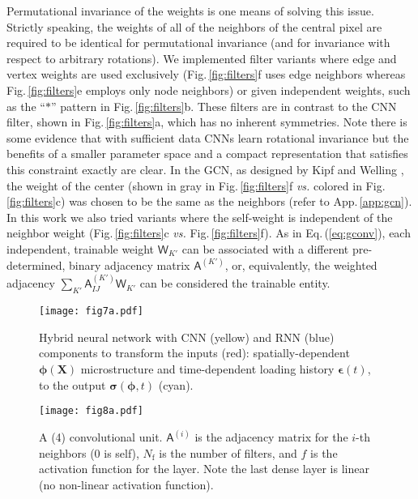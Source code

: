 \documentclass[12pt,reqno]{article}
\newcommand{\ADD}[1]{{#1}}
\newcommand{\aref}[1]{App.\,\ref{#1}}
\newcommand{\fref}[1]{Fig.\,\ref{#1}}
\newcommand{\eref}[1]{Eq.\,(\ref{#1})}
\newcommand{\vs}{{\it vs.}\! }
\newcommand{\Xb}{\mathbf{X}}
\newcommand{\As}{\mathsf{A}}
\newcommand{\Ws}{\mathsf{W}}
\newcommand{\epsilonb}{{\boldsymbol{\epsilon}}}
\newcommand{\sigmab}{{\boldsymbol{\sigma}}}
\newcommand{\phib}{{\boldsymbol{\phi}}}
\newcommand{\arch}[3]{({#1}\text{:}{#2}\text{:}{#3})}
\begin{document}
Permutational invariance of the weights is one means of solving this issue.
Strictly speaking, the  weights of all of the  neighbors of the central pixel are required to be identical for permutational invariance (and for invariance with respect to arbitrary rotations).
We implemented filter variants where edge and vertex weights are used exclusively \ADD{(\fref{fig:filters}f uses edge neighbors whereas \fref{fig:filters}e employs only node neighbors)} or given independent weights, such as the ``$\ast$'' pattern in \fref{fig:filters}b.
\ADD{
These filters are in contrast to the CNN filter, shown in \fref{fig:filters}a, which has no inherent symmetries.
}
Note there is some evidence that with sufficient data CNNs learn rotational invariance \cite{quiroga2018revisiting} but the benefits of a smaller parameter space and a compact representation that satisfies this constraint exactly are clear.
In the GCN, as designed by Kipf and Welling \cite{kipf2016semi}, the weight of the center (shown in gray in \fref{fig:filters}f \vs colored in \fref{fig:filters}c) was chosen to be the same as the neighbors (refer to \aref{app:gcn}).
In this work we also tried variants where the self-weight is independent of the neighbor weight (\fref{fig:filters}c \vs \fref{fig:filters}f).
\ADD{
As in \eref{eq:gconv}, each independent, trainable weight $\Ws_{K'}$ can be associated with a different pre-determined, binary adjacency matrix $\As^{(K')}$, or, equivalently, the weighted adjacency  $\sum_{K'} \As^{(K')}_{IJ} \Ws_{K'}$ can be considered the trainable entity.
}

\begin{figure}
\centering
\texttt{[image: fig7a.pdf]}
\caption{Hybrid neural network with CNN (yellow) and RNN (blue) components to transform the inputs (red): spatially-dependent $\phib(\Xb)$ microstructure and time-dependent loading history $\epsilonb(t)$, to the output $\sigmab(\phib,t)$ (cyan).
}
\label{fig:architecture}
\end{figure}

\begin{figure}
\centering
\texttt{[image: fig8a.pdf]}
\caption{\ADD{A \arch{4}{2}{2} convolutional unit.
$\As^{(i)}$ is the adjacency matrix for the $i$-th neighbors (0 is self), $N_\text{f}$ is the number of filters, and $f$ is the activation function for the layer.
Note the last dense layer is linear (no non-linear activation function).
} }
\label{fig:cnn}
\end{figure}
\end{document}
